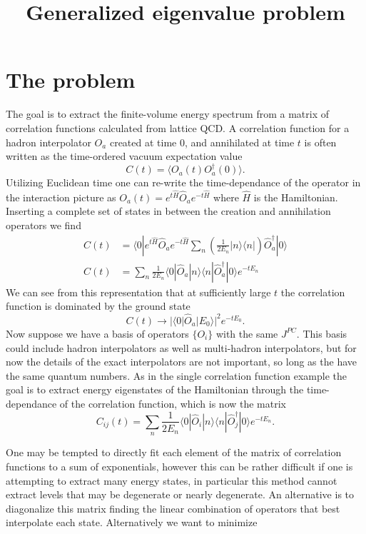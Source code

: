 \documentclass[onecolumn,article,preprintnumbers]{revtex4-1}
\begin{document}
\title{Generalized eigenvalue problem}

\section{The problem}
The goal is to extract the finite-volume energy spectrum from a matrix of correlation functions calculated from lattice QCD.
A correlation function for a hadron interpolator $O_a$ created at time $0$, and annihilated at time $t$ is often written as the time-ordered vacuum expectation value
\begin{equation}
C(t)=\langle O_a(t)O_a^{\dag}(0)\rangle .
\end{equation}
Utilizing Euclidean time one can re-write the time-dependance of the operator in the interaction picture as $O_a(t)=e^{t\hat{H}}\hat{O}_ae^{-t\hat{H}}$ where $\hat{H}$ is the Hamiltonian. Inserting a complete set of states in between the creation and annihilation operators we find
\begin{align}
C(t)&=\langle0|e^{t\hat{H}}\hat{O}_ae^{-t\hat{H}}\sum_n\left(\frac{1}{2E_n}|n\rangle\langle n|\right)\hat{O}_a^{\dag}|0\rangle \\
C(t)&=\sum_n\frac{1}{2E_n}\langle0|\hat{O}_a|n\rangle\langle n |\hat{O}_a^{\dag}|0\rangle  e^{-tE_n}
\end{align}
We can see from this representation that at sufficiently large $t$ the correlation function is dominated by the ground state
\begin{equation}
C(t)\rightarrow |\langle 0|\hat{O}_a|E_0\rangle | ^2 e^{-tE_0} \label{larget}.
\end{equation}
Now suppose we have a basis of operators $\{O_i\}$ with the same $J^{PC}$. This basis could include hadron interpolators as well as multi-hadron interpolators, but for now the details of the exact interpolators are not important, so long as the have the same quantum numbers. As in the single correlation function example the goal is to extract energy eigenstates of the Hamiltonian through the time-dependance of the correlation function, which is now the matrix
\begin{equation}
C_{ij}(t)=\sum_n\frac{1}{2E_n}\langle0|\hat{O}_i|n\rangle\langle n |\hat{O}_j^{\dag}|0\rangle  e^{-tE_n}
\label{spec_dec}.
\end{equation}

One may be tempted to directly fit each element of the matrix of correlation functions to a sum of exponentials, however this can be rather difficult if one is attempting to extract many energy states, in particular this method cannot extract levels that may be degenerate or nearly degenerate. An alternative is to diagonalize this matrix finding the linear combination of operators that best interpolate each state. Alternatively we want to minimize
\end{document}
